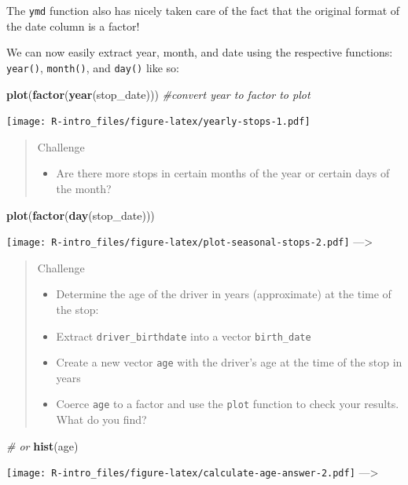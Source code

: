 \documentclass[
]{book}
\newenvironment{Shaded}{\begin{snugshade}}{\end{snugshade}}
\newcommand{\CommentTok}[1]{\textcolor[rgb]{0.56,0.35,0.01}{\textit{#1}}}
\newcommand{\KeywordTok}[1]{\textcolor[rgb]{0.13,0.29,0.53}{\textbf{#1}}}
\newcommand{\NormalTok}[1]{#1}
\newcommand{\OperatorTok}[1]{\textcolor[rgb]{0.81,0.36,0.00}{\textbf{#1}}}
\newcommand{\StringTok}[1]{\textcolor[rgb]{0.31,0.60,0.02}{#1}}
\providecommand{\tightlist}{%
  \setlength{\itemsep}{0pt}\setlength{\parskip}{0pt}}
\begin{document}
\begin{Shaded}
\end{Shaded}

The \texttt{ymd} function also has nicely taken care of the fact that the original format of the date column is a factor!

We can now easily extract year, month, and date using the respective functions: \texttt{year()}, \texttt{month()}, and \texttt{day()} like so:

\begin{Shaded}
\begin{Highlighting}[]
\KeywordTok{plot}\NormalTok{(}\KeywordTok{factor}\NormalTok{(}\KeywordTok{year}\NormalTok{(stop_date))) }\CommentTok{#convert year to factor to plot}
\end{Highlighting}
\end{Shaded}

\texttt{[image: R-intro\_files/figure-latex/yearly-stops-1.pdf]}

\begin{quote}
Challenge

\begin{itemize}
\tightlist
\item
  Are there more stops in certain months of the year or certain days of the month?
\end{itemize}
\end{quote}

\begin{Shaded}
\begin{Highlighting}[]
\KeywordTok{plot}\NormalTok{(}\KeywordTok{factor}\NormalTok{(}\KeywordTok{day}\NormalTok{(stop_date)))}
\end{Highlighting}
\end{Shaded}

\texttt{[image: R-intro\_files/figure-latex/plot-seasonal-stops-2.pdf]}
---\textgreater{}

\begin{quote}
Challenge

\begin{itemize}
\tightlist
\item
  Determine the age of the driver in years (approximate) at the time of the stop:
\item
  Extract \texttt{driver\_birthdate} into a vector \texttt{birth\_date}
\item
  Create a new vector \texttt{age} with the driver's age at the time of the stop in years
\item
  Coerce \texttt{age} to a factor and use the \texttt{plot} function to check your results. What do you find?
\end{itemize}
\end{quote}

\begin{Shaded}
\begin{Highlighting}[]
\CommentTok{# or}
\KeywordTok{hist}\NormalTok{(age)}
\end{Highlighting}
\end{Shaded}

\texttt{[image: R-intro\_files/figure-latex/calculate-age-answer-2.pdf]}
---\textgreater{}

  
\end{document}
